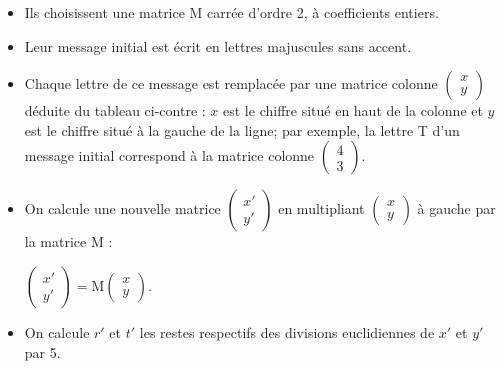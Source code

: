 \parbox{0.53\linewidth}{
\begin{itemize}
\item Ils choisissent une matrice M carrée d'ordre 2, à coefficients entiers.
\item Leur message initial est écrit en lettres majuscules sans accent.
\item Chaque lettre de ce message est remplacée par une matrice colonne $\begin{pmatrix} x\\y \end{pmatrix}$ déduite du tableau ci-contre : $x$ est le chiffre situé en haut de la colonne et $y$ est le chiffre situé à la gauche de la ligne; par exemple, la lettre \textsf{T} d'un message initial correspond à la matrice colonne $\begin{pmatrix} 4\\3 \end{pmatrix}$.
\item On calcule une nouvelle matrice $\begin{pmatrix} x'\\y' \end{pmatrix}$ en multipliant $\begin{pmatrix} x\\y \end{pmatrix}$ à gauche par la matrice M : 
	
$\begin{pmatrix} x'\\y' \end{pmatrix} = \text{M} \begin{pmatrix} x\\y \end{pmatrix}$.	
	\item On calcule $r'$ et $t'$ les restes respectifs des divisions euclidiennes de $x'$ et $y'$ par 5. 
\end{itemize}} \hfill